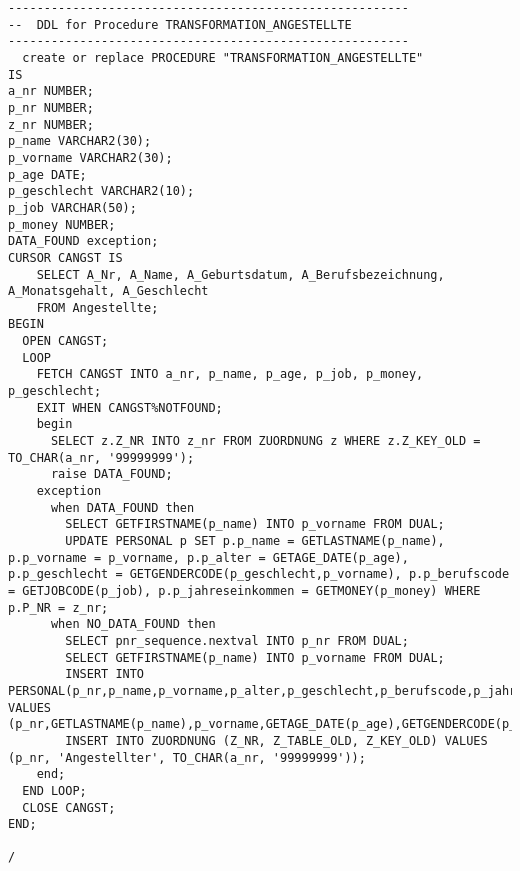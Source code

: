 \documentclass{scrartcl}
\begin{document}
\begin{lstlisting}
--------------------------------------------------------
--  DDL for Procedure TRANSFORMATION_ANGESTELLTE
--------------------------------------------------------
  create or replace PROCEDURE "TRANSFORMATION_ANGESTELLTE" 
IS
a_nr NUMBER;
p_nr NUMBER;
z_nr NUMBER;
p_name VARCHAR2(30);
p_vorname VARCHAR2(30);
p_age DATE;
p_geschlecht VARCHAR2(10);
p_job VARCHAR(50);
p_money NUMBER;
DATA_FOUND exception;
CURSOR CANGST IS
	SELECT A_Nr, A_Name, A_Geburtsdatum, A_Berufsbezeichnung, A_Monatsgehalt, A_Geschlecht
	FROM Angestellte;
BEGIN
  OPEN CANGST;
  LOOP 
    FETCH CANGST INTO a_nr, p_name, p_age, p_job, p_money, p_geschlecht;
    EXIT WHEN CANGST%NOTFOUND;
    begin 
      SELECT z.Z_NR INTO z_nr FROM ZUORDNUNG z WHERE z.Z_KEY_OLD = TO_CHAR(a_nr, '99999999');
      raise DATA_FOUND;
    exception
      when DATA_FOUND then
        SELECT GETFIRSTNAME(p_name) INTO p_vorname FROM DUAL;
        UPDATE PERSONAL p SET p.p_name = GETLASTNAME(p_name), p.p_vorname = p_vorname, p.p_alter = GETAGE_DATE(p_age), p.p_geschlecht = GETGENDERCODE(p_geschlecht,p_vorname), p.p_berufscode = GETJOBCODE(p_job), p.p_jahreseinkommen = GETMONEY(p_money) WHERE p.P_NR = z_nr;
      when NO_DATA_FOUND then 
        SELECT pnr_sequence.nextval INTO p_nr FROM DUAL;
        SELECT GETFIRSTNAME(p_name) INTO p_vorname FROM DUAL;
        INSERT INTO PERSONAL(p_nr,p_name,p_vorname,p_alter,p_geschlecht,p_berufscode,p_jahreseinkommen) VALUES (p_nr,GETLASTNAME(p_name),p_vorname,GETAGE_DATE(p_age),GETGENDERCODE(p_geschlecht,p_vorname),GETJOBCODE(p_job),GETMONEY(p_money));
        INSERT INTO ZUORDNUNG (Z_NR, Z_TABLE_OLD, Z_KEY_OLD) VALUES (p_nr, 'Angestellter', TO_CHAR(a_nr, '99999999'));
    end;
  END LOOP; 
  CLOSE CANGST;
END;

/
\end{lstlisting}
\end{document}
